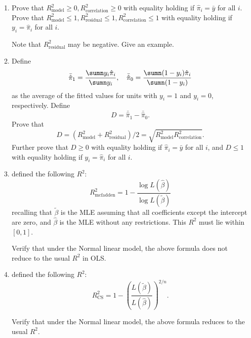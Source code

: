 \begin{enumerate}
\item
Prove that $R^2_{\text{model}} \geq 0, R^2_{\text{correlation}}  \geq 0$ with equality holding if  $\hat{\pi}_i = \bar{y}$ for all $i$. Prove that $R^2_{\text{model}}  \leq 1, R^2_{\text{residual}}  \leq 1, R^2_{\text{correlation}}  \leq 1$ with equality holding if  $y_i =\hat{\pi}_i$ for all $i$. 

Note that $R^2_{\text{residual}}$ may be negative. Give an example. 

\item
Define 
$$
\bar{ \hat{\pi} }_1 = \frac{ \sumn y_i  \hat{\pi}_i  }{ \sumn y_i},\quad
\bar{ \hat{\pi} }_0 = \frac{ \sumn (1-y_i)  \hat{\pi}_i  }{ \sumn (1-y_i)}
$$
as the average of the fitted values for units with $y_i=1$ and $y_i=0$, respectively. Define
$$
D = \bar{ \hat{\pi} }_1  - \bar{ \hat{\pi} }_0.
$$
Prove that 
$$
D = (R^2_{\text{model}} +R^2_{\text{residual}}  )/2 = \sqrt{  R^2_{\text{model}}  R^2_{\text{correlation}}  }.
$$
Further prove that $D\geq 0$ with equality holding if   $\hat{\pi}_i = \bar{y}$ for all $i$, and $D\leq 1$ with equality holding if   $y_i =\hat{\pi}_i$ for all $i$. 

\item
\citet{mcfadden1974conditional} defined the following $R^2$:
$$
R^2_{\text{mcfadden}} = 1 - \frac{ \log L(\hat{\beta})  }{  \log L(\tilde{\beta}) }
$$
recalling that
$\tilde{\beta}$ is the MLE assuming that all coefficients except the intercept are zero, and $\hat{\beta}$ is the MLE without any restrictions.
This $R^2$ must lie within $[0,1]$. 

Verify that under the Normal linear model, the above formula does not reduce to the usual $R^2$ in OLS. 




\item
\citet{cox1989analysis} defined the following $R^2$:
$$
R^2_{\text{CS}} = 1 - \left(  \frac{  L(\tilde{\beta}) }{  L(\hat{\beta}) }\right)^{2/n}.
$$

Verify that under the Normal linear model, the above formula reduces to the usual $R^2$. 
\end{enumerate}





